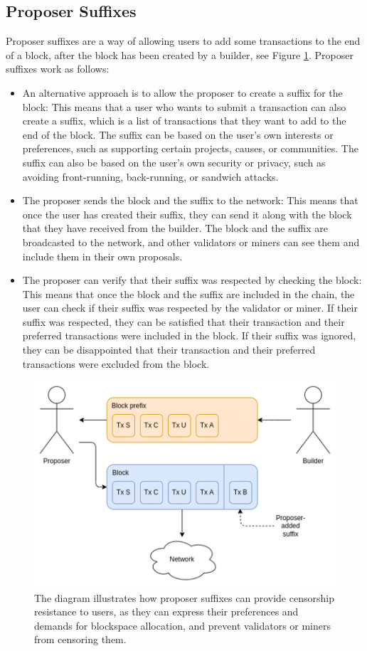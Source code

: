 \subsection{Proposer Suffixes}
Proposer suffixes are a way of allowing users to add some transactions to the end of a block, after the block has been created by a builder, see Figure \ref{fig:L22_f9}. Proposer suffixes work as follows:\\
\begin{itemize}
	\item An alternative approach is to allow the proposer to create a suffix for the block: This means that a user who wants to submit a transaction can also create a suffix, which is a list of transactions that they want to add to the end of the block. The suffix can be based on the user’s own interests or preferences, such as supporting certain projects, causes, or communities. The suffix can also be based on the user’s own security or privacy, such as avoiding front-running, back-running, or sandwich attacks.
	\item The proposer sends the block and the suffix to the network: This means that once the user has created their suffix, they can send it along with the block that they have received from the builder. The block and the suffix are broadcasted to the network, and other validators or miners can see them and include them in their own proposals.
	\item The proposer can verify that their suffix was respected by checking the block: This means that once the block and the suffix are included in the chain, the user can check if their suffix was respected by the validator or miner. If their suffix was respected, they can be satisfied that their transaction and their preferred transactions were included in the block. If their suffix was ignored, they can be disappointed that their transaction and their preferred transactions were excluded from the block.
\end{itemize}
\begin{center}
	\begin{figure}
		\centering
		\includegraphics[width=0.7\linewidth]{Fig/22/F9}
		\caption{The diagram illustrates how proposer suffixes can provide censorship resistance to users, as they can express their preferences and demands for blockspace allocation, and prevent validators or miners from censoring them.}
		\label{fig:L22_f9}
	\end{figure}
\end{center}
